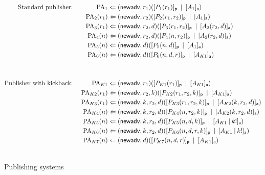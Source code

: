 \documentclass{LMCS}
\newcommand{\pfn}[1]{\mathsf{#1}}  \newcommand{\cfn}[1]{\mathsf{#1}}  \newcommand{\ownfnt}[1]{{\mathsf{#1}}}
\newcommand{\CnewNT}[1]{(\pfn{new} {#1})}
\newcommand{\Cpar}{\mathbin{|}}
\newcommand{\Cloc}[2]{[#1]_{\ownfnt{#2}}}
\begin{document}
\begin{figure}[t]
  \begin{alignat*}{2}
\text{Standard publisher:} & & \qquad
    \text{PA}_{1} &\Leftarrow \CnewNT{\adv,r_1}(\Cloc{P_{1}(r_1)}{p} \;\Cpar\;\Cloc{A_{1}}{a})\\
&&    \text{PA}_{2}(r_1) &\Leftarrow \CnewNT{\adv,r_2}(\Cloc{P_{2}(r_1,r_2)}{p} \;\Cpar\;\Cloc{A_{1}}{a})\\
&&    \text{PA}_{3}(r_1) &\Leftarrow \CnewNT{\adv,r_2,d}(\Cloc{P_{3}(r_1,r_2)}{p} \;\Cpar\;\Cloc{A_{2}(r_2,d)}{a})\\
&&    \text{PA}_{4}(n) &\Leftarrow \CnewNT{\adv,r_2,d}(\Cloc{P_{4}(n,r_2)}{p} \;\Cpar\;\Cloc{A_{2}(r_2,d)}{a})\\
&&    \text{PA}_{5}(n) &\Leftarrow \CnewNT{\adv,d}(\Cloc{P_{5}(n,d)}{p} \;\Cpar\;\Cloc{A_{1} }{a})\\
&&    \text{PA}_{6}(n) &\Leftarrow \CnewNT{\adv,d}(\Cloc{P_{6}(n,d,r)}{p} \;\Cpar\;\Cloc{A_{K1}}{a})\\
\\\\
\text{Publisher with kickback:} & &\qquad
    \text{PA}_{K1} &\Leftarrow \CnewNT{\adv,r_1}(\Cloc{P_{K1}(r_1)}{p} \;\Cpar\;\Cloc{A_{K1}}{a})\\
&&    \text{PA}_{K2}(r_1) &\Leftarrow \CnewNT{\adv,r_2,k}(\Cloc{P_{K2}(r_1,r_2,k)}{p} \;\Cpar\;\Cloc{A_{K1}}{a})\\
&&    \text{PA}_{K3}(r_1) &\Leftarrow \CnewNT{\adv,k,r_2,d}(\Cloc{P_{K3}(r_1,r_2,k)}{p} \;\Cpar\;\Cloc{A_{K2}(k,r_2,d)}{a})\\
&&    \text{PA}_{K4}(n) &\Leftarrow \CnewNT{\adv,k,r_2,d}(\Cloc{P_{K4}(n,r_2,k)}{p} \;\Cpar\;\Cloc{A_{K2}(k,r_2,d)}{a})\\
&&    \text{PA}_{K5}(n) &\Leftarrow \CnewNT{\adv,k,r_2,d}(\Cloc{P_{K5}(n,d,k)}{p} \;\Cpar\;\Cloc{A_{K1} \Cpar k!}{a})\\
&&    \text{PA}_{K6}(n) &\Leftarrow \CnewNT{\adv,k,r_2,d}(\Cloc{P_{K6}(n,d,r,k)}{p} \;\Cpar\;\Cloc{A_{K1} \Cpar k!}{a})\\
&&    \text{PA}_{K7}(n) &\Leftarrow \CnewNT{\adv,d}(\Cloc{P_{K7}(n,d,r)}{p} \;\Cpar\;\Cloc{A_{K1} }{a})\\\\
  \end{alignat*}
  \caption{Publishing  systems}
  \label{fig:pubconfs}
\end{figure}
\end{document}
